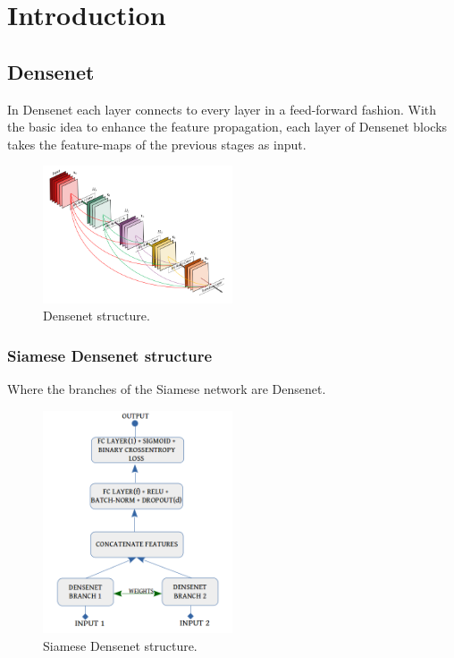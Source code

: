 
\chapter{Introduction}

\section{Densenet}

In Densenet each layer connects to every layer in a feed-forward fashion. 
With the basic idea to enhance the feature propagation, each layer of Densenet blocks takes the feature-maps of the previous stages as input.  
\begin{figure}[ht]
\centering
\includegraphics[width=0.5\textwidth]{images/densenet/densenet.png}
\caption{\label{fig:densenet}Densenet structure.}
\end{figure}
\flushbottom
\newpage
\subsection{Siamese Densenet structure}

Where the branches of the Siamese network are Densenet. 
\begin{figure}[ht]
\centering
\includegraphics[width=0.5\textwidth]{images/densenet/siamese_densenet_structure.png}
\caption{\label{fig:dn_siamese}Siamese Densenet structure.}
\end{figure}

